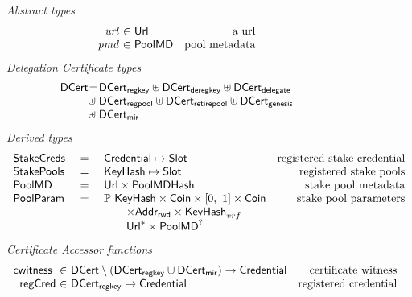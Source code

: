 \begin{figure}[htb]
  \emph{Abstract types}
  \begin{equation*}
    \begin{array}{r@{~\in~}lr}
      \var{url} & \URL & \text{a url}\\
      \var{pmd} & \PoolMD & \text{pool metadata}\\
    \end{array}
  \end{equation*}
  \emph{Delegation Certificate types}
  \begin{equation*}
  \begin{array}{r@{}c@{}l}
    \DCert &=& \DCertRegKey \uniondistinct \DCertDeRegKey \uniondistinct \DCertDeleg \\
                &\hfill\uniondistinct\;&
                \DCertRegPool \uniondistinct \DCertRetirePool \uniondistinct
                                         \DCertGen\\
           &\hfill\uniondistinct\;& \DCertMir
  \end{array}
  \end{equation*}
  \emph{Derived types}
  \begin{equation*}
    \begin{array}{lclr}
      \mathsf{StakeCreds}
      & ~=~
      & \mathsf{Credential} \mapsto \mathsf{Slot}
      & \text{registered stake credential} \\
      \mathsf{StakePools}
      & ~=~
      & \mathsf{KeyHash} \mapsto \mathsf{Slot}
      & \text{registered stake pools} \\
      \mathsf{PoolMD}
      & ~=~
      & \mathsf{Url} \times \mathsf{PoolMDHash}
      & \text{stake pool metadata} \\
      \mathsf{PoolParam}
      & ~=~
      & \mathbb{P}~\mathsf{KeyHash} \times \mathsf{Coin} \times [0,~1] \times \mathsf{Coin}
      & \text{stake pool parameters} \\
      & & \qquad \times \mathsf{Addr_{rwd}} \times \mathsf{KeyHash}_{vrf} \\
      & & \qquad \mathsf{Url}^{*} \times \mathsf{PoolMD}^?
    \end{array}
  \end{equation*}
  \emph{Certificate Accessor functions}
  \begin{equation*}
    \begin{array}{r@{~\in~}lr}
      \cwitness{} & \DCert\setminus(\DCertRegKey\cup\DCertMir) \to \Credential & \text{certificate witness} \\
      \fun{regCred} & \DCertRegKey \to \Credential & \text{registered credential} \\

\end{array}
\end{equation*}
\end{figure}
